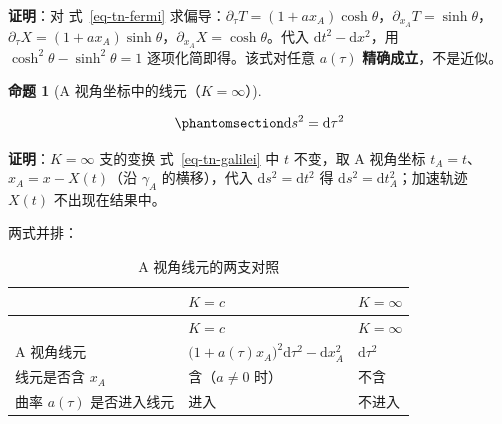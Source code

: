 \documentclass[
  chinese,
  a4paper,
  UTF8,
  12pt,
  oneside,
  openany]{ctexbook}
\theoremstyle{plain}
\theoremstyle{plain}
\theoremstyle{plain}
\newtheorem{proposition}{命题}[chapter]
\theoremstyle{definition}
\theoremstyle{plain}
\theoremstyle{plain}
\theoremstyle{remark}
\begin{document}
\textbf{证明}：对 式~\ref{eq-tn-fermi}
求偏导：\(\partial_\tau T=(1+a x_A)\cosh\theta\)，\(\partial_{x_A}T=\sinh\theta\)，\(\partial_\tau X=(1+a x_A)\sinh\theta\)，\(\partial_{x_A}X=\cosh\theta\)。代入
\(\mathrm{d}t^{2}-\mathrm{d}x^{2}\)，用
\(\cosh^{2}\theta-\sinh^{2}\theta=1\) 逐项化简即得。该式对任意
\(a(\tau)\) \textbf{精确成立}，不是近似。

\begin{proposition}[A
视角坐标中的线元（\(K=\infty\)）]\protect\hypertarget{prp-tn-metric-inf}{}\label{prp-tn-metric-inf}

\begin{equation}\protect\phantomsection\label{eq-tn-metric-inf}{
\mathrm{d}s^{2}=\mathrm{d}\tau^{2}
}\end{equation}

\end{proposition}

\textbf{证明}：\(K=\infty\) 支的变换 式~\ref{eq-tn-galilei} 中 \(t\)
不变，取 A 视角坐标 \(t_A=t\)、\(x_A=x-X(t)\)（沿 \(\gamma_A\)
的横移），代入 \(\mathrm{d}s^{2}=\mathrm{d}t^{2}\) 得
\(\mathrm{d}s^{2}=\mathrm{d}t_A^{2}\)；加速轨迹 \(X(t)\)
不出现在结果中。

两式并排：

\begin{longtable}[]{@{}
  >{\raggedright\arraybackslash}p{}
  >{\raggedright\arraybackslash}p{}
  >{\raggedright\arraybackslash}p{}@{}}
\caption{A 视角线元的两支对照}\label{tbl-tn-metric}\tabularnewline
\toprule\noalign{}
\begin{minipage}[b]{\linewidth}\raggedright
\end{minipage} & \begin{minipage}[b]{\linewidth}\raggedright
\(K=c\)
\end{minipage} & \begin{minipage}[b]{\linewidth}\raggedright
\(K=\infty\)
\end{minipage} \\
\midrule\noalign{}
\endfirsthead
\toprule\noalign{}
\begin{minipage}[b]{\linewidth}\raggedright
\end{minipage} & \begin{minipage}[b]{\linewidth}\raggedright
\(K=c\)
\end{minipage} & \begin{minipage}[b]{\linewidth}\raggedright
\(K=\infty\)
\end{minipage} \\
\midrule\noalign{}
\endhead
\bottomrule\noalign{}
\endlastfoot
A 视角线元 &
\(\bigl(1+a(\tau)x_A\bigr)^{2}\mathrm{d}\tau^{2}-\mathrm{d}x_A^{2}\) &
\(\mathrm{d}\tau^{2}\) \\
线元是否含 \(x_A\) & 含（\(a\neq0\) 时） & 不含 \\
曲率 \(a(\tau)\) 是否进入线元 & 进入 & 不进入 \\
\end{longtable}
\end{document}
